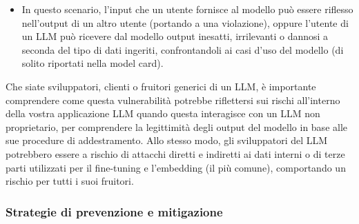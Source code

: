\documentclass[
]{article}
\providecommand{\tightlist}{%
  \setlength{\itemsep}{0pt}\setlength{\parskip}{0pt}}
\begin{document}
\begin{enumerate}
  \begin{itemize}
  \tightlist
  \item
    In questo scenario, l'input che un utente fornisce al modello può
    essere riflesso nell'output di un altro utente (portando a una
    violazione), oppure l'utente di un LLM può ricevere dal modello
    output inesatti, irrilevanti o dannosi a seconda del tipo di dati
    ingeriti, confrontandoli ai casi d'uso del modello (di solito
    riportati nella model card).
  \end{itemize}
\end{enumerate}

Che siate sviluppatori, clienti o fruitori generici di un LLM, è
importante comprendere come questa vulnerabilità potrebbe riflettersi
sui rischi all'interno della vostra applicazione LLM quando questa
interagisce con un LLM non proprietario, per comprendere la legittimità
degli output del modello in base alle sue procedure di addestramento.
Allo stesso modo, gli sviluppatori del LLM potrebbero essere a rischio
di attacchi diretti e indiretti ai dati interni o di terze parti
utilizzati per il fine-tuning e l'embedding (il più comune), comportando
un rischio per tutti i suoi fruitori.

\subsubsection{Strategie di prevenzione e
mitigazione}\label{strategie-di-prevenzione-e-mitigazione}
\end{document}
